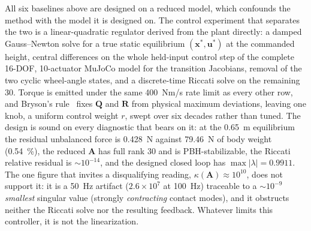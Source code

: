 \documentclass[a4paper,fleqn]{cas-dc}
\begin{document}
All six baselines above are designed on a reduced model, which confounds the method with the model it is designed on. The control experiment that separates the two is a linear-quadratic regulator derived from the plant directly: a damped Gauss--Newton solve for a true static equilibrium $(\mathbf{x}^\ast,\mathbf{u}^\ast)$ at the commanded height, central differences on the whole held-input control step of the complete 16-DOF, 10-actuator MuJoCo model for the transition Jacobians, removal of the two cyclic wheel-angle states, and a discrete-time Riccati solve on the remaining \num{30}. Torque is emitted under the same \SI{400}{Nm/s} rate limit as every other row, and Bryson's rule~\cite{bryson1975optimal} fixes $\mathbf{Q}$ and $\mathbf{R}$ from physical maximum deviations, leaving one knob, a uniform control weight $r$, swept over six decades rather than tuned. The design is sound on every diagnostic that bears on it: at the \SI{0.65}{m} equilibrium the residual unbalanced force is \SI{0.428}{N} against \SI{79.46}{N} of body weight (\SI{0.54}{\percent}), the reduced $\mathbf{A}$ has full rank \num{30} and is PBH-stabilizable, the Riccati relative residual is ${\sim}10^{-14}$, and the designed closed loop has $\max|\lambda|{=}0.9911$. The one figure that invites a disqualifying reading, $\kappa(\mathbf{A}){\approx}10^{10}$, does not support it: it is a \SI{50}{Hz} artifact ($2.6{\times}10^{7}$ at \SI{100}{Hz}) traceable to a ${\sim}10^{-9}$ \emph{smallest} singular value (strongly \emph{contracting} contact modes), and it obstructs neither the Riccati solve nor the resulting feedback. Whatever limits this controller, it is not the linearization.
\end{document}

